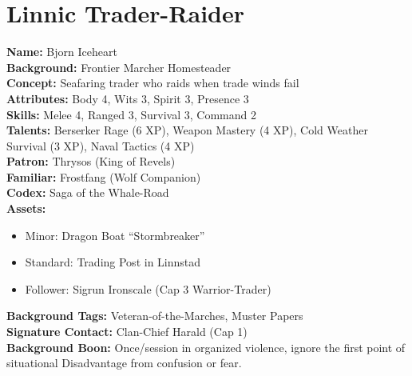 \documentclass[11pt]{article}
\begin{document}
\section{Linnic Trader-Raider}
\textbf{Name:} Bjorn Iceheart \\
\textbf{Background:} Frontier Marcher Homesteader \\
\textbf{Concept:} Seafaring trader who raids when trade winds fail \\
\textbf{Attributes:} Body 4, Wits 3, Spirit 3, Presence 3 \\
\textbf{Skills:} Melee 4, Ranged 3, Survival 3, Command 2 \\
\textbf{Talents:} Berserker Rage (6 XP), Weapon Mastery (4 XP), Cold Weather Survival (3 XP), Naval Tactics (4 XP) \\
\textbf{Patron:} Thrysos (King of Revels) \\
\textbf{Familiar:} Frostfang (Wolf Companion) \\
\textbf{Codex:} Saga of the Whale-Road \\
\textbf{Assets:}
\begin{itemize}
    \item Minor: Dragon Boat ``Stormbreaker''
    \item Standard: Trading Post in Linnstad
    \item Follower: Sigrun Ironscale (Cap 3 Warrior-Trader)
\end{itemize}
\textbf{Background Tags:} Veteran-of-the-Marches, Muster Papers \\
\textbf{Signature Contact:} Clan-Chief Harald (Cap 1) \\
\textbf{Background Boon:} Once/session in organized violence, ignore the first point of situational Disadvantage from confusion or fear.
\end{document}

